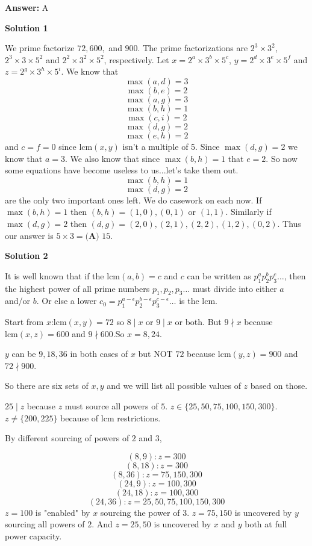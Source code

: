 \begin{enumerate}
 \textbf{Answer: }A



\textbf{Solution 1}

We prime factorize $72,600,$ and $900$. The prime factorizations are $2^3\times 3^2$, $2^3\times 3\times 5^2$ and $2^2\times 3^2\times 5^2$, respectively. Let $x=2^a\times 3^b\times 5^c$, $y=2^d\times 3^e\times 5^f$ and $z=2^g\times 3^h\times 5^i$. We know that 
 \[\max(a,d)=3\] 
 \[\max(b,e)=2\] 
 \[\max(a,g)=3\] 
 \[\max(b,h)=1\] 
 \[\max(c,i)=2\] 
 \[\max(d,g)=2\] 
 \[\max(e,h)=2\] and $c=f=0$ since $\text{lcm}(x,y)$ isn't a multiple of 5. Since $\max(d,g)=2$ we know that $a=3$. We also know that since $\max(b,h)=1$ that $e=2$. So now some equations have become useless to us...let's take them out. 
 \[\max(b,h)=1\] 
 \[\max(d,g)=2\] are the only two important ones left. We do casework on each now. If $\max(b,h)=1$ then $(b,h)=(1,0),(0,1)$ or $(1,1)$. Similarly if $\max(d,g)=2$ then $(d,g)=(2,0),(2,1),(2,2),(1,2),(0,2)$. Thus our answer is $5\times 3=\boxed{\textbf{(A) }15}.$




\textbf{Solution 2}

It is well known that if the $\text{lcm}(a,b)=c$ and $c$ can be written as $p_1^ap_2^bp_3^c\dots$, then the highest power of all prime numbers $p_1,p_2,p_3\dots$ must divide into either $a$ and/or $b$. Or else a lower $c_0=p_1^{a-\epsilon}p_2^{b-\epsilon}p_3^{c-\epsilon}\dots$ is the $\text{lcm}$.

 Start from $x$:$\text{lcm}(x,y)=72$ so $8\mid x$ or $9\mid x$ or both. But $9\nmid x$ because $\text{lcm}(x,z)=600$ and $9\nmid 600$.So $x=8,24$.

 $y$ can be $9,18,36$ in both cases of $x$ but NOT $72$ because $\text{lcm}(y,z)=900$ and $72\nmid 900$.

 So there are six sets of $x,y$ and we will list all possible values of $z$ based on those.

 $25\mid z$ because $z$ must source all powers of $5$. $z\in\{25,50,75,100,150,300\}$. $z\ne\{200,225\}$ because of $\text{lcm}$ restrictions.

 By different sourcing of powers of $2$ and $3$,

 
 \[(8,9):z=300\]
 \[(8,18):z=300\]
 \[(8,36):z=75,150,300\]
 \[(24,9):z=100,300\]
 \[(24,18):z=100,300\]
 \[(24,36):z=25,50,75,100,150,300\]
$z=100$ is "enabled" by $x$ sourcing the power of $3$. $z=75,150$ is uncovered by $y$ sourcing all powers of $2$. And $z=25,50$ is uncovered by $x$ and $y$ both at full power capacity.


\end{enumerate}
